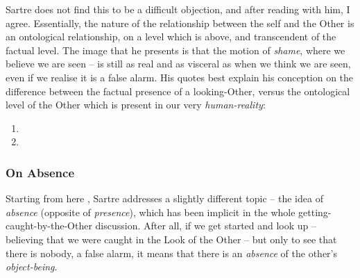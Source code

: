 Sartre does not find this to be a difficult objection, and after reading with him, I agree. Essentially, the nature of the relationship between the self and the Other is an ontological relationship, on a level which is above, and transcendent of the factual level. The image that he presents is that the motion of \emph{shame}, where we believe we are seen -- is still as real and as visceral as when we think we are seen, even if we realise it is a false alarm. His quotes best explain his conception on the difference between the factual presence of a looking-Other, versus the ontological level of the Other which is present in our very \emph{human-reality}:

\begin{enumerate}
  \item {}
  \item {}
\end{enumerate}

\subsubsection{On Absence}

\noindent
Starting from here \autocite[378]{sartre}, Sartre addresses a slightly different topic -- the idea of \emph{absence} (opposite of \emph{presence}), which has been implicit in the whole getting-caught-by-the-Other discussion. After all, if we get started and look up -- believing that we were caught in the Look of the Other -- but only to see that there is nobody, a false alarm, it means that there is an \emph{absence} of the other's \emph{object-being}.

